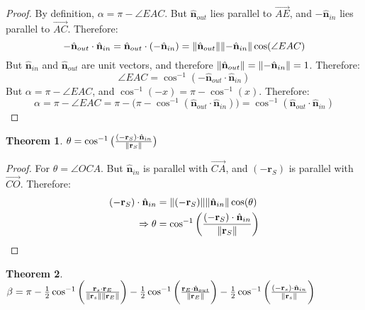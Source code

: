 \documentclass{article}
\theoremstyle{mystyle}
\newtheorem{theorem}{Theorem}[section]
\DeclarePairedDelimiter\norm{\lVert}{\rVert}
\begin{document}
\begin{proof}
By definition, $\alpha = \pi - \angle EAC$. But $\hat{\mathbf{n}}_{out}$ lies parallel to $\overrightarrow{AE}$, and $-\hat{\mathbf{n}}_{in}$ lies parallel to $\overrightarrow{AC}$. Therefore:
\begin{equation*}
-\hat{\mathbf{n}}_{out}\cdot \hat{\mathbf{n}}_{in} = \hat{\mathbf{n}}_{out}\cdot (-\hat{\mathbf{n}}_{in}) = \norm{\hat{\mathbf{n}}_{out}}\norm{-\hat{\mathbf{n}}_{in}}\cos(\angle EAC)
\end{equation*}
But $\hat{\mathbf{n}}_{in}$ and $\hat{\mathbf{n}}_{out}$ are unit vectors, and therefore $\norm{\hat{\mathbf{n}}_{out}} = \norm{-\hat{\mathbf{n}}_{in}} = 1$. Therefore:
\begin{equation*}
    \angle EAC = \cos^{-1}(-\hat{\mathbf{n}}_{out}\cdot\hat{\mathbf{n}}_{in})
\end{equation*}
But $\alpha = \pi - \angle EAC$, and $\cos^{-1}(-x) = \pi - \cos^{-1}(x)$. Therefore:
\begin{equation*}
    \alpha = \pi - \angle EAC = \pi - \big(\pi - \cos^{-1}(\hat{\mathbf{n}}_{out}\cdot \hat{\mathbf{n}}_{in})\big) = \cos^{-1}(\hat{\mathbf{n}}_{out}\cdot \hat{\mathbf{n}}_{in})
\end{equation*}
\end{proof}
\begin{theorem}
$\theta = \cos^{-1}\big(\frac{(-\mathbf{r}_{S})\cdot \hat{\mathbf{n}}_{in}}{\norm{\mathbf{r}_{S}}}\big)$
\end{theorem}
\begin{proof}
For $\theta = \angle OCA$. But $\hat{\mathbf{n}}_{in}$ is parallel with $\overrightarrow{CA}$, and $(-\mathbf{r}_{S})$ is parallel with $\overrightarrow{CO}$. Therefore:
\begin{align*}
    (-\mathbf{r}_{S})\cdot \hat{\mathbf{n}}_{in} &= \norm{(-\mathbf{r}_{S})}\norm{\hat{\mathbf{n}}_{in}}\cos(\theta)\\
    \Rightarrow \theta &= \cos^{-1}\bigg(\frac{(-\mathbf{r}_{S})\cdot \hat{\mathbf{n}}_{in}}{\norm{\mathbf{r}_{S}}}\bigg)
\end{align*}
\end{proof}
\begin{theorem}
$\beta = \pi - \frac{1}{2}\cos^{-1}\bigg(\frac{\mathbf{r}_{s}\cdot \mathbf{r}_{E}}{\norm{\mathbf{r}_{s}}\norm{\mathbf{r}_{E}}}\bigg) - \frac{1}{2}\cos^{-1}\bigg(\frac{\mathbf{r}_{E}\cdot \hat{\mathbf{n}}_{out}}{\norm{\mathbf{r}_{E}}}\bigg) - \frac{1}{2}\cos^{-1}\bigg(\frac{(-\mathbf{r}_{s})\cdot \hat{\mathbf{n}}_{in}}{\norm{\mathbf{r}_{s}}}\bigg)$
\end{theorem}
\end{document}
